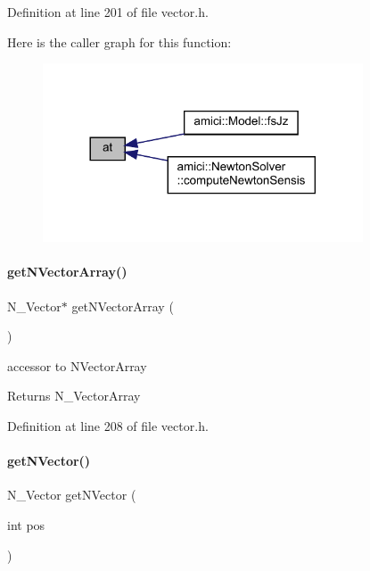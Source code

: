 Definition at line 201 of file vector.\+h.

Here is the caller graph for this function\+:
\nopagebreak
\begin{figure}[H]
\begin{center}
\leavevmode
\includegraphics[width=269pt]{classamici_1_1_ami_vector_array_a214f110ad614eb97ec2c6f3b6a9f2c8c_icgraph}
\end{center}
\end{figure}
\mbox{\label{classamici_1_1_ami_vector_array_a5ccad03e89676a4b404322899579f961}} 
\paragraph{\texorpdfstring{get\+N\+Vector\+Array()}{getNVectorArray()}}
{\footnotesize\ttfamily N\+\_\+\+Vector$\ast$ get\+N\+Vector\+Array (\begin{DoxyParamCaption}{ }\end{DoxyParamCaption})}

accessor to N\+Vector\+Array \begin{DoxyReturn}{Returns}
N\+\_\+\+Vector\+Array 
\end{DoxyReturn}


Definition at line 208 of file vector.\+h.

\mbox{\label{classamici_1_1_ami_vector_array_a387bfb58f20388d99da7f946a3a27ab8}} 
\paragraph{\texorpdfstring{get\+N\+Vector()}{getNVector()}}
{\footnotesize\ttfamily N\+\_\+\+Vector get\+N\+Vector (\begin{DoxyParamCaption}\item[{int}]{pos }\end{DoxyParamCaption})}

